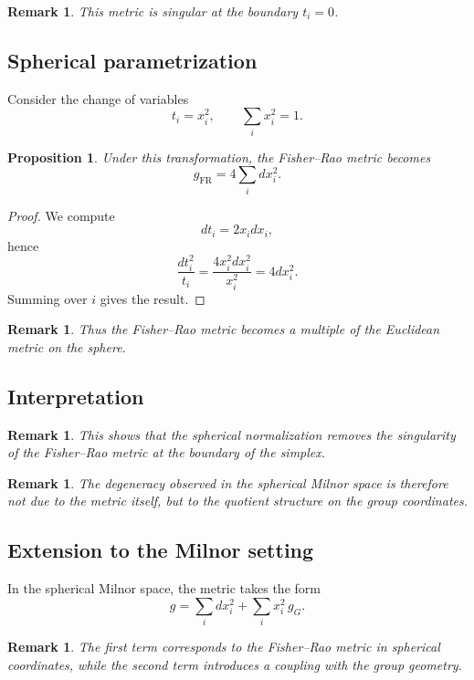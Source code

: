 \documentclass[11pt]{amsart}
\newtheorem{proposition}[theorem]{Proposition}
\newtheorem{remark}[theorem]{Remark}
\begin{document}
\begin{remark}
This metric is singular at the boundary $t_i=0$.
\end{remark}

\subsection{Spherical parametrization}

Consider the change of variables
\[
t_i = x_i^2,
\qquad
\sum_i x_i^2 = 1.
\]

\begin{proposition}
Under this transformation, the Fisher--Rao metric becomes
\[
g_{\mathrm{FR}} = 4 \sum_i dx_i^2.
\]
\end{proposition}

\begin{proof}
We compute
\[
dt_i = 2x_i dx_i,
\]
hence
\[
\frac{dt_i^2}{t_i}
=
\frac{4x_i^2 dx_i^2}{x_i^2}
=
4 dx_i^2.
\]
Summing over $i$ gives the result.
\end{proof}

\begin{remark}
Thus the Fisher--Rao metric becomes a multiple of the Euclidean metric on the sphere.
\end{remark}

\subsection{Interpretation}

\begin{remark}
This shows that the spherical normalization removes the singularity of the Fisher--Rao metric at the boundary of the simplex.
\end{remark}

\begin{remark}
The degeneracy observed in the spherical Milnor space is therefore not due to the metric itself, but to the quotient structure on the group coordinates.
\end{remark}

\subsection{Extension to the Milnor setting}

In the spherical Milnor space, the metric takes the form
\[
g = \sum_i dx_i^2 + \sum_i x_i^2 \, g_G.
\]

\begin{remark}
The first term corresponds to the Fisher--Rao metric in spherical coordinates, while the second term introduces a coupling with the group geometry.
\end{remark}
\end{document}
